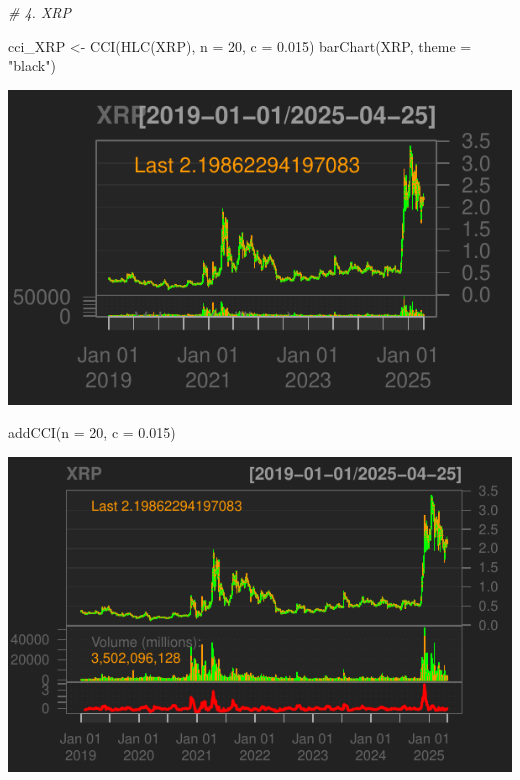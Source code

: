 \documentclass[]{tufte-handout}
\newenvironment{Shaded}{}{}
\newcommand{\AttributeTok}[1]{\textcolor[rgb]{0.49,0.56,0.16}{#1}}
\newcommand{\CommentTok}[1]{\textcolor[rgb]{0.38,0.63,0.69}{\textit{#1}}}
\newcommand{\DecValTok}[1]{\textcolor[rgb]{0.25,0.63,0.44}{#1}}
\newcommand{\FloatTok}[1]{\textcolor[rgb]{0.25,0.63,0.44}{#1}}
\newcommand{\FunctionTok}[1]{\textcolor[rgb]{0.02,0.16,0.49}{#1}}
\newcommand{\NormalTok}[1]{#1}
\newcommand{\OtherTok}[1]{\textcolor[rgb]{0.00,0.44,0.13}{#1}}
\newcommand{\StringTok}[1]{\textcolor[rgb]{0.25,0.44,0.63}{#1}}
\begin{document}
\begin{Shaded}
\begin{Highlighting}[]
\CommentTok{\# 4. XRP}

\NormalTok{cci\_XRP }\OtherTok{\textless{}{-}} \FunctionTok{CCI}\NormalTok{(}\FunctionTok{HLC}\NormalTok{(XRP), }\AttributeTok{n =} \DecValTok{20}\NormalTok{, }\AttributeTok{c =} \FloatTok{0.015}\NormalTok{)}
\FunctionTok{barChart}\NormalTok{(XRP, }\AttributeTok{theme =} \StringTok{"black"}\NormalTok{)}
\end{Highlighting}
\end{Shaded}

\includegraphics{cripto_update_files/figure-latex/unnamed-chunk-12-7}

\begin{Shaded}
\begin{Highlighting}[]
\FunctionTok{addCCI}\NormalTok{(}\AttributeTok{n =} \DecValTok{20}\NormalTok{, }\AttributeTok{c =} \FloatTok{0.015}\NormalTok{)}
\end{Highlighting}
\end{Shaded}

\includegraphics{cripto_update_files/figure-latex/unnamed-chunk-12-8}
\end{document}

